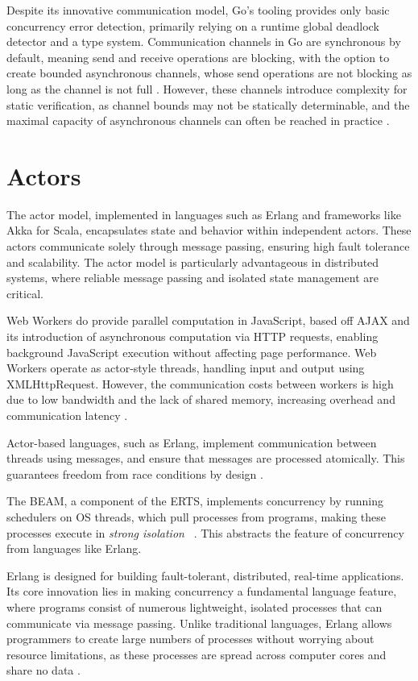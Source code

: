 \documentclass[]{final}
\begin{document}
Despite its innovative communication model, Go's tooling provides only basic
concurrency error detection, primarily relying on a runtime global deadlock
detector and a type system. Communication channels
in Go are synchronous by default, meaning send and receive operations are
blocking, with the option to create bounded asynchronous channels, whose
send operations are not blocking as long as the channel
is not full \cite{lange_empirical_2019}. However, these channels
introduce complexity for static verification, as channel bounds may not be
statically determinable, and the maximal capacity of
asynchronous channels can often be reached in practice \cite{lange_empirical_2019}.

\section{Actors}
The actor model, implemented in languages such as Erlang and frameworks
like Akka for Scala, encapsulates state and behavior within independent actors.
These actors communicate solely through message passing, ensuring high fault
tolerance and scalability. The actor model is particularly advantageous in
distributed systems, where reliable message passing and isolated state
management are critical.

Web Workers do provide parallel computation in JavaScript, based off AJAX and its
introduction of asynchronous computation via HTTP requests, enabling background
JavaScript execution without affecting page performance. Web Workers operate as
actor-style threads, handling input and output using
XMLHttpRequest. However, the communication costs between workers
is high due to low bandwidth and the lack of shared memory,
increasing overhead and communication latency \cite{namiot_js_2015}.

Actor-based languages, such as Erlang,
implement communication between threads
using messages, and ensure that messages are processed
atomically. This guarantees freedom from race conditions
by design \cite{bianchi_survey_2018}.

The BEAM, a component of the ERTS, implements concurrency by running schedulers
on OS threads, which pull processes from programs, making these processes execute in
\textit{strong isolation} ~\cite{stenman_erlang_2024, armstrong_making_2003, debenedetto_elixir_2019}.
This abstracts the feature of concurrency from languages like Erlang.

Erlang is designed for building fault-tolerant, distributed, real-time
applications. Its core innovation lies in making concurrency a fundamental
language feature, where programs consist of numerous lightweight,
isolated processes that can communicate via message passing.
Unlike traditional languages, Erlang allows programmers to
create large numbers of processes without worrying about resource limitations,
as these processes are spread across computer cores and share no data \cite{armstrong_erlang_2010}.
\end{document}
